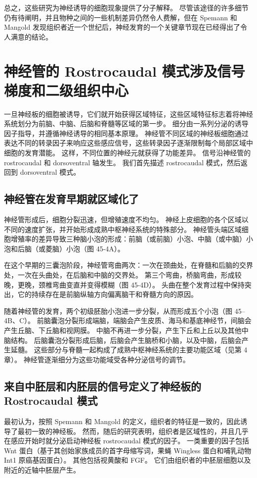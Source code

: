 总之，这些研究为神经诱导的细胞现象提供了分子解释。 尽管该途径的许多细节仍有待阐明，并且物种之间的一些机制差异仍然令人费解，但在 Spemann 和 Mangold 发现组织者近一个世纪后，神经发育的一个关键章节现在已经得出了令人满意的结论。

\section{神经管的 Rostrocaudal 模式涉及信号梯度和二级组织中心}
一旦神经板的细胞被诱导，它们就开始获得区域特征，这些区域特征标志着将神经系统划分为前脑、中脑、后脑和脊髓等区域的第一步。 细分由一系列分泌的诱导因子指导，并遵循神经诱导的相同基本原理。 神经管不同区域的神经板细胞通过表达不同的转录因子来响应这些感应信号，这些转录因子逐渐限制每个局部区域中细胞的发育潜能。 这样，不同位置的神经元就获得了功能差异。 信号沿神经管的 rostrocaudal 和 dorsoventral 轴发生。 我们首先描述 rostrocaudal 模式，然后返回到 dorsoventral 模式。

\subsection{神经管在发育早期就区域化了}
神经管形成后，细胞分裂迅速，但增殖速度不均匀。 神经上皮细胞的各个区域以不同的速度扩张，并开始形成成熟中枢神经系统的特殊部分。 神经管头端区域细胞增殖率的差异导致三种脑小泡的形成：前脑（或前脑）小泡、中脑（或中脑）小泡和后脑（或菱脑）小泡（图 45-4A）。

在这个早期的三囊泡阶段，神经管弯曲两次：一次在颈曲处，在脊髓和后脑的交界处，一次在头曲处，在后脑和中脑的交界处。 第三个弯曲，桥脑弯曲，形成较晚，更晚，颈椎弯曲变直并变得模糊（图 45-4D）。 头曲在整个发育过程中保持突出，它的持续存在是前脑纵轴方向偏离脑干和脊髓方向的原因。

随着神经管的发育，两个初级胚胎小泡进一步分裂，从而形成五个小泡（图 45–4B、C）。 前脑囊泡分裂形成端脑，端脑会产生皮质、海马和基底神经节，间脑会产生丘脑、下丘脑和视网膜。 中脑不再进一步分裂，产生下丘和上丘以及其他中脑结构。 后脑囊泡分裂形成后脑，后脑会产生脑桥和小脑，以及中脑，后脑会产生延髓。 这些部分与脊髓一起构成了成熟中枢神经系统的主要功能区域（见第 4 章）。 神经管逐渐细分为这些功能域受各种分泌信号的调节。

\subsection{来自中胚层和内胚层的信号定义了神经板的 Rostrocaudal 模式}
最初认为，按照 Spemann 和 Mangold 的定义，组织者的特征是一致的，因此诱导了最初一致的神经板。 然而，随后的研究表明，组织者是区域性的，并且几乎在感应开始时就分泌启动神经板 rostrocaudal 模式的因子。 一类重要的因子包括 Wnt 蛋白（基于其创始家族成员的首字母缩写词，果蝇 Wingless 蛋白和哺乳动物 Int1 原癌基因蛋白）。 其他包括视黄酸和 FGF。 它们由组织者的中胚层细胞以及附近的近轴中胚层产生。


